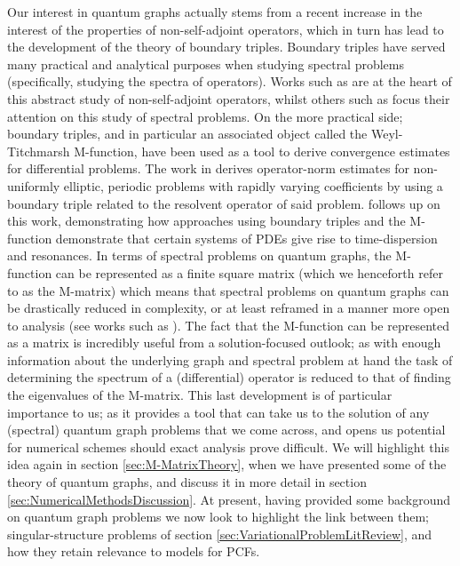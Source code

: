 Our interest in quantum graphs actually stems from a recent increase in the interest of the properties of non-self-adjoint operators, which in turn has lead to the development of the theory of boundary triples.
Boundary triples have served many practical and analytical purposes when studying spectral problems (specifically, studying the spectra of operators).
Works such as \cite{ryzhov2007functional} are at the heart of this abstract study of non-self-adjoint operators, whilst others such as \cite{ryzhov2009spectral} focus their attention on this study of spectral problems.
On the more practical side; boundary triples, and in particular an associated object called the Weyl-Titchmarsh M-function, have been used as a tool to derive convergence estimates for differential problems.
The work in \cite{cherednichenko2017norm} derives operator-norm estimates for non-uniformly elliptic, periodic problems with rapidly varying coefficients by using a boundary triple related to the resolvent operator of said problem.
\cite{cherednichenko2018effective} follows up on this work, demonstrating how approaches using boundary triples and the M-function demonstrate that certain systems of PDEs give rise to time-dispersion and resonances. 
In terms of spectral problems on quantum graphs, the M-function can be represented as a finite square matrix \cite{ershova2014isospectrality} (which we henceforth refer to as the M-matrix) which means that spectral problems on quantum graphs can be drastically reduced in complexity, or at least reframed in a manner more open to analysis (see works such as \cite{ershova2016isospectrality}).
The fact that the M-function can be represented as a matrix is incredibly useful from a solution-focused outlook; as with enough information about the underlying graph and spectral problem at hand the task of determining the spectrum of a (differential) operator is reduced to that of finding the eigenvalues of the M-matrix.
This last development is of particular importance to us; as it provides a tool that can take us to the solution of any (spectral) quantum graph problems that we come across, and opens us potential for numerical schemes should exact analysis prove difficult.
We will highlight this idea again in section \ref{sec:M-MatrixTheory}, when we have presented some of the theory of quantum graphs, and discuss it in more detail in section \ref{sec:NumericalMethodsDiscussion}.
At present, having provided some background on quantum graph problems we now look to highlight the link between them; singular-structure problems of section \ref{sec:VariationalProblemLitReview}, and how they retain relevance to models for PCFs. \newline

